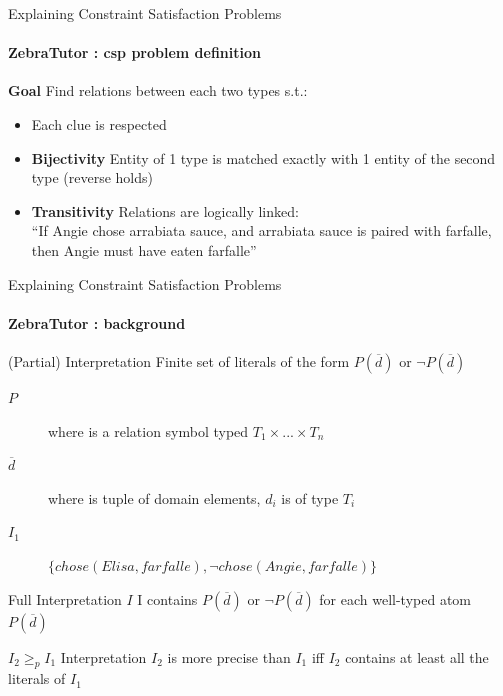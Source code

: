 \documentclass{beamer}
\begin{document}
\begin{frame}{\small{Explaining Constraint Satisfaction Problems}}
    \framesubtitle{ZebraTutor : csp problem definition}
    \vfill
    \textbf{Goal} Find relations between each two types s.t.:
    {\small
    \begin{itemize}
        \item Each clue is respected
        \item \textbf{Bijectivity} Entity of 1 type is matched exactly with 1 entity of the second type (reverse holds)
        \item \textbf{Transitivity} Relations are logically linked:\\
              ``If Angie chose arrabiata sauce, and arrabiata sauce is paired with farfalle, then Angie must have eaten farfalle''
    \end{itemize}
    }

\end{frame}


\begin{frame}{\small{Explaining Constraint Satisfaction Problems}}
    \framesubtitle{ZebraTutor : background}
    \begin{block}{(Partial) Interpretation}
        Finite set of literals of the form $P(\overline{d})$ or $\neg P(\overline{d})$
        \begin{description}
            \item[$P$] {\small where  is a relation symbol typed $T_1 \times ... \times T_n$}
            \item[$\overline{d}$] {\small where  is tuple of domain elements, $d_i$ is of type $T_i$}
            \item[$I_1$] $\{chose(Elisa, farfalle), \neg chose(Angie, farfalle) \}$
        \end{description}
    \end{block}
    \begin{block}{Full Interpretation $I$}
        I contains $P(\overline{d})$ or $\neg P(\overline{d})$ for each well-typed atom $P(\overline{d})$
    \end{block}

    \begin{block}{$I_2 \geq_p I_1$}
        Interpretation $I_2$ is more precise than $I_1$  iff $I_2$ contains at least all the literals of $I_1$  
   \end{block}
\end{frame}
\end{document}

